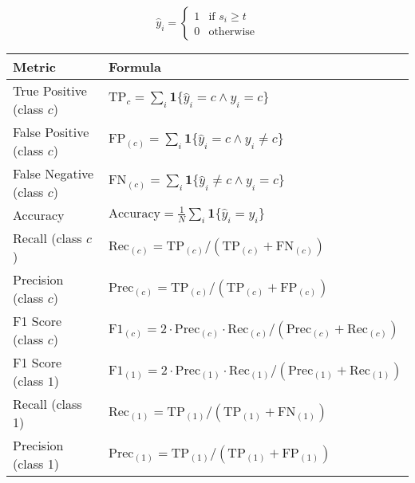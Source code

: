 $$
    \hat{y}_i =
    \begin{cases}
        1 & \text{if } s_i \geq t \\
        0 & \text{otherwise}
    \end{cases}
$$


\begin{table}[H]
    \centering
    \renewcommand{\arraystretch}{1.2}
    \setlength{\tabcolsep}{10pt}
    \begin{tabular}{lp{}}
        \toprule
        \textbf{Metric}            & \textbf{Formula}                                                                                                        \\
        \midrule
        True Positive (class $c$)  & $\mathrm{TP}_c = \sum_{i}\mathbf{1}\{\hat{y}_i = c \wedge y_i = c\}$                                                    \\
        False Positive (class $c$) & $\mathrm{FP}_{(c)} = \sum_{i}\mathbf{1}\{\hat{y}_i = c \wedge y_i \neq c\}$                                             \\
        False Negative (class $c$) & $\mathrm{FN}_{(c)} = \sum_{i}\mathbf{1}\{\hat{y}_i \neq c \wedge y_i = c\}$                                             \\
        Accuracy                   & $\mathrm{Accuracy} = \frac{1}{N} \sum_{i} \mathbf{1}\{ \hat{y}_i = y_i \}$                                              \\
        Recall (class $c$)         & $\mathrm{Rec}_{(c)} = \mathrm{TP}_{(c)} / (\mathrm{TP}_{(c)} + \mathrm{FN}_{(c)})$                                      \\
        Precision (class $c$)      & $\mathrm{Prec}_{(c)} = \mathrm{TP}_{(c)} / (\mathrm{TP}_{(c)} + \mathrm{FP}_{(c)})$                                     \\
        F1 Score (class $c$)       & $\mathrm{F1}_{(c)} = 2 \cdot \mathrm{Prec}_{(c)} \cdot \mathrm{Rec}_{(c)} / (\mathrm{Prec}_{(c)} + \mathrm{Rec}_{(c)})$ \\
        \midrule
        F1 Score (class $1$)       & $\mathrm{F1}_{(1)} = 2 \cdot \mathrm{Prec}_{(1)} \cdot \mathrm{Rec}_{(1)} / (\mathrm{Prec}_{(1)} + \mathrm{Rec}_{(1)})$ \\
        Recall (class 1)           & $\mathrm{Rec}_{(1)} = \mathrm{TP}_{(1)} / (\mathrm{TP}_{(1)} + \mathrm{FN}_{(1)})$                                      \\
        Precision (class 1)        & $\mathrm{Prec}_{(1)} = \mathrm{TP}_{(1)} / (\mathrm{TP}_{(1)} + \mathrm{FP}_{(1)})$                                     \\

\end{tabular}
\end{table}
